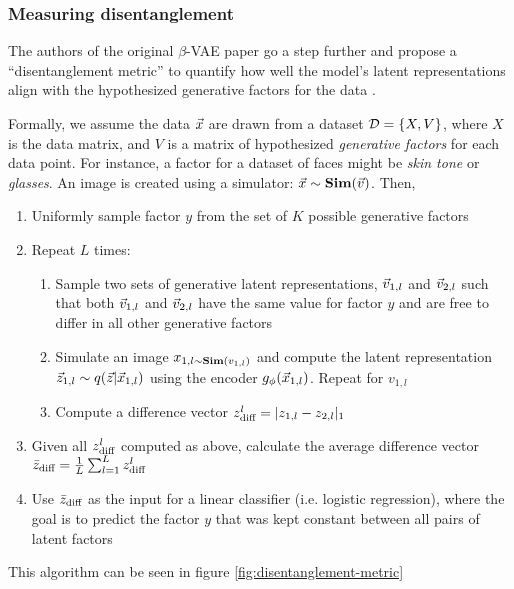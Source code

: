 \subsubsection{Measuring disentanglement}

The authors of the original $\beta$-VAE paper go a step further and propose a ``disentanglement metric'' to quantify how well the model's latent representations align with the hypothesized generative factors for the data \cite{higgins2016beta}.

Formally, we assume the data $\vec{x}$ are drawn from a dataset $\mathcal{D}=\{X, V\}$, where $X$ is the data matrix, and $V$ is a matrix of hypothesized {\it generative factors} for each data point. For instance, a factor for a dataset of faces might be {\it skin tone} or {\it glasses}. An image is created using a simulator: $\vec{x}\sim\mathbf{Sim}(\vec{v})$. Then,
\begin{enumerate}
    \item Uniformly sample factor $y$ from the set of $K$ possible generative factors
    \item Repeat $L$ times:
    \begin{enumerate}
        \item Sample two sets of generative latent representations, $\vec{v}_{1,l}$ and $\vec{v}_{2,l}$ such that both $\vec{v}_{1,l}$ and $\vec{v}_{2,l}$ have the same value for factor $y$ and are free to differ in all other generative factors
        \item Simulate an image $x_{1,l\sim\mathbf{Sim}(v_{1,l})}$ and compute the latent representation $\vec{z}_{1,l}\sim q(\vec{z}|\vec{x}_{1,l})$ using the encoder $g_\phi(\vec{x}_{1,l})$. Repeat for $v_{1,l}$
        \item Compute a difference vector $z^l_{\text{diff}}=|z_{1,l}-z_{2,l}|_1$
    \end{enumerate}
    \item Given all $z^l_{\text{diff}}$ computed as above, calculate the average difference vector $\bar{z}_{\text{diff}} = \frac{1}{L}\sum_{l=1}^Lz^l_{\text{diff}}$
    \item Use $\bar{z}_{\text{diff}}$ as the input for a linear classifier (i.e. logistic regression), where the goal is to predict the factor $y$ that was kept constant between all pairs of latent factors
\end{enumerate}

This algorithm can be seen in figure \ref{fig:disentanglement-metric}

